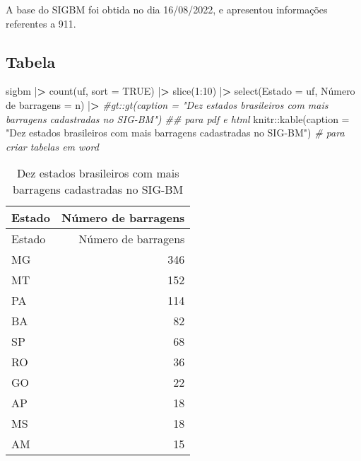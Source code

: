 \documentclass[
]{article}
\newenvironment{Shaded}{\begin{snugshade}}{\end{snugshade}}
\newcommand{\AttributeTok}[1]{\textcolor[rgb]{0.77,0.63,0.00}{#1}}
\newcommand{\CommentTok}[1]{\textcolor[rgb]{0.56,0.35,0.01}{\textit{#1}}}
\newcommand{\ConstantTok}[1]{\textcolor[rgb]{0.00,0.00,0.00}{#1}}
\newcommand{\DecValTok}[1]{\textcolor[rgb]{0.00,0.00,0.81}{#1}}
\newcommand{\ErrorTok}[1]{\textcolor[rgb]{0.64,0.00,0.00}{\textbf{#1}}}
\newcommand{\FunctionTok}[1]{\textcolor[rgb]{0.00,0.00,0.00}{#1}}
\newcommand{\NormalTok}[1]{#1}
\newcommand{\OtherTok}[1]{\textcolor[rgb]{0.56,0.35,0.01}{#1}}
\newcommand{\SpecialCharTok}[1]{\textcolor[rgb]{0.00,0.00,0.00}{#1}}
\newcommand{\StringTok}[1]{\textcolor[rgb]{0.31,0.60,0.02}{#1}}
\begin{document}
A base do SIGBM foi obtida no dia 16/08/2022, e apresentou informações
referentes a 911.

\hypertarget{tabela}{%
\subsection{Tabela}\label{tabela}}

\begin{Shaded}
\begin{Highlighting}[]
\NormalTok{sigbm }\SpecialCharTok{|}\ErrorTok{\textgreater{}}
  \FunctionTok{count}\NormalTok{(uf, }\AttributeTok{sort =} \ConstantTok{TRUE}\NormalTok{) }\SpecialCharTok{|}\ErrorTok{\textgreater{}}
  \FunctionTok{slice}\NormalTok{(}\DecValTok{1}\SpecialCharTok{:}\DecValTok{10}\NormalTok{) }\SpecialCharTok{|}\ErrorTok{\textgreater{}}
  \FunctionTok{select}\NormalTok{(}\StringTok{\textasciigrave{}}\AttributeTok{Estado}\StringTok{\textasciigrave{}} \OtherTok{=}\NormalTok{ uf, }\StringTok{\textasciigrave{}}\AttributeTok{Número de barragens}\StringTok{\textasciigrave{}} \OtherTok{=}\NormalTok{ n) }\SpecialCharTok{|}\ErrorTok{\textgreater{}}
  \CommentTok{\#gt::gt(caption = "Dez estados brasileiros com mais barragens cadastradas no SIG{-}BM") \#\# para pdf e html}
\NormalTok{  knitr}\SpecialCharTok{::}\FunctionTok{kable}\NormalTok{(}\AttributeTok{caption =} \StringTok{"Dez estados brasileiros com mais barragens cadastradas no SIG{-}BM"}\NormalTok{) }\CommentTok{\# para criar tabelas em word}
\end{Highlighting}
\end{Shaded}

\begin{longtable}[]{@{}lr@{}}
\caption{Dez estados brasileiros com mais barragens cadastradas no
SIG-BM}\tabularnewline
\toprule
Estado & Número de barragens \\
\midrule
\endfirsthead
\toprule
Estado & Número de barragens \\
\midrule
\endhead
MG & 346 \\
MT & 152 \\
PA & 114 \\
BA & 82 \\
SP & 68 \\
RO & 36 \\
GO & 22 \\
AP & 18 \\
MS & 18 \\
AM & 15 \\
\bottomrule
\end{longtable}
\end{document}
